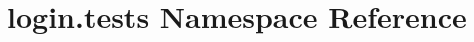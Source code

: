 \hypertarget{namespacelogin_1_1tests}{\section{login.\-tests Namespace Reference}
\label{namespacelogin_1_1tests}
}
